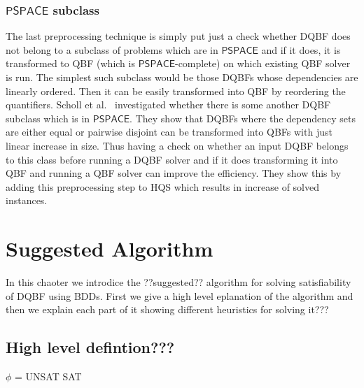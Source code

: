\documentclass[
  digital, %
  twoside, %
  table,   %
  nolof,     %
  nolot,     %
]{fithesis3}
\theoremstyle{definition}
\theoremstyle{remark}
\newcommand{\ComplexityFont}[1]{\mathsf{#1}}
\newcommand{\PSPACE}{\ComplexityFont{PSPACE}}
\begin{document}
\subsection{\texorpdfstring{$\PSPACE$}{PSPACE} subclass}
The last preprocessing technique is simply put just a check whether DQBF does not belong to a subclass of problems which are in $\PSPACE$ and if it does, it is transformed to QBF (which is $\PSPACE$-complete) on which existing QBF solver is run. The simplest such subclass would be those DQBFs whose dependencies are linearly ordered. Then it can be easily transformed into QBF by reordering the quantifiers. Scholl et al.~\cite{PSPACEsubclass} investigated whether there is some another DQBF subclass which is in $\PSPACE$. They show that DQBFs where the dependency sets are either equal or pairwise disjoint can be transformed into QBFs with just linear increase in size. Thus having a check on whether an input DQBF belongs to this class before running a DQBF solver and if it does transforming it into QBF and running a QBF solver can improve the efficiency. They show this by adding this preprocessing step to HQS which results in increase of solved instances.


\chapter{Suggested Algorithm}
\label{chap:algorithm}

In this chaoter we introdice the ??suggested?? algorithm for solving satisfiability of DQBF using BDDs. First we give a high level eplanation of the algorithm and then we explain each part of it showing different heuristics for solving it???

\section{High level defintion???}
\begin{algorithm}
  \caption{???}
  \label{alg:general}
  \begin{algorithmic}[1]
    \State {}
    \State $\phi$ = 
    \State {} \label{alg:general:elimination}
      \State \Return UNSAT
    \Else
      \State \Return SAT
     \EndIf
    \EndFunction
  \end{algorithmic}
\end{algorithm}
\end{document}
